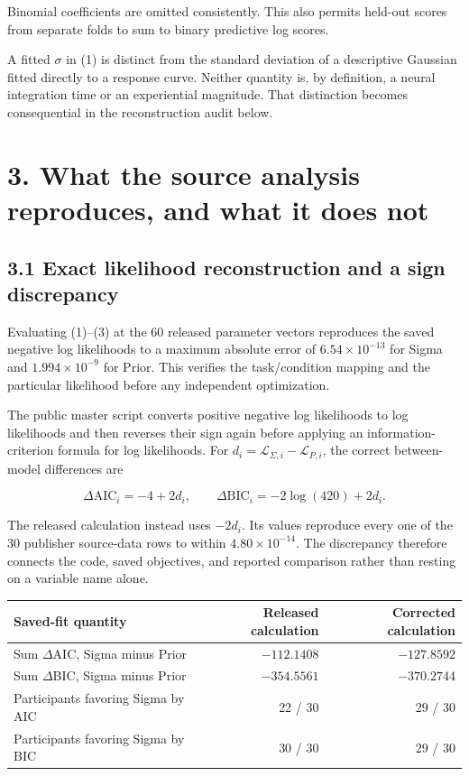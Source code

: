 \documentclass[
  11pt,
]{article}
\let\ctdoldsection\section
\renewcommand{\section}{\Needspace{8\baselineskip}\ctdoldsection}
\let\ctdoldsubsection\subsection
\renewcommand{\subsection}{\Needspace{6\baselineskip}\ctdoldsubsection}
\begin{document}
Binomial coefficients are omitted consistently. This also permits
held-out scores from separate folds to sum to binary predictive log
scores.

A fitted \(\sigma\) in (1) is distinct from the standard deviation of a
descriptive Gaussian fitted directly to a response curve. Neither
quantity is, by definition, a neural integration time or an experiential
magnitude. That distinction becomes consequential in the reconstruction
audit below.

\hypertarget{what-the-source-analysis-reproduces-and-what-it-does-not}{%
\section{3. What the source analysis reproduces, and what it does
not}\label{what-the-source-analysis-reproduces-and-what-it-does-not}}

\hypertarget{exact-likelihood-reconstruction-and-a-sign-discrepancy}{%
\subsection{3.1 Exact likelihood reconstruction and a sign
discrepancy}\label{exact-likelihood-reconstruction-and-a-sign-discrepancy}}

Evaluating (1)--(3) at the 60 released parameter vectors reproduces the
saved negative log likelihoods to a maximum absolute error of
\(6.54\times10^{-13}\) for Sigma and \(1.994\times10^{-9}\) for Prior.
This verifies the task/condition mapping and the particular likelihood
before any independent optimization.

The public master script converts positive negative log likelihoods to
log likelihoods and then reverses their sign again before applying an
information-criterion formula for log likelihoods. For
\(d_i=\mathcal L_{\Sigma,i}-\mathcal L_{P,i}\), the correct
between-model differences are

\[
\Delta\mathrm{AIC}_i=-4+2d_i,\qquad
\Delta\mathrm{BIC}_i=-2\log(420)+2d_i.
\tag{4}
\]

The released calculation instead uses \(-2d_i\). Its values reproduce
every one of the 30 publisher source-data rows to within
\(4.80\times10^{-14}\). The discrepancy therefore connects the code,
saved objectives, and reported comparison rather than resting on a
variable name alone.

\begin{longtable}[]{@{}lrr@{}}
\toprule\noalign{}
Saved-fit quantity & Released calculation & Corrected calculation \\
\midrule\noalign{}
\endhead
\bottomrule\noalign{}
\endlastfoot
Sum \(\Delta\)AIC, Sigma minus Prior & \(-112.1408\) & \(-127.8592\) \\
Sum \(\Delta\)BIC, Sigma minus Prior & \(-354.5561\) & \(-370.2744\) \\
Participants favoring Sigma by AIC & 22 / 30 & 29 / 30 \\
Participants favoring Sigma by BIC & 30 / 30 & 29 / 30 \\
\end{longtable}
\end{document}
